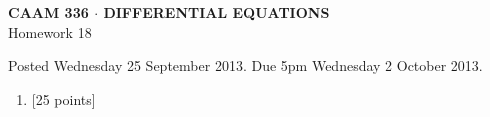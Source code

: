 \documentclass[10pt]{article}
\begin{document}
\vspace*{-5em}
\begin{center}
\large \textsf{\textbf{CAAM 336 $\cdot$ DIFFERENTIAL EQUATIONS}\\[0.5em]
Homework 18 }
\end{center}

Posted Wednesday 25 September 2013.  Due 5pm Wednesday 2 October 2013.

\begin{enumerate}\addtocounter{enumi}{17}
\item {[25 points]}  
\end{enumerate}
\end{document}
